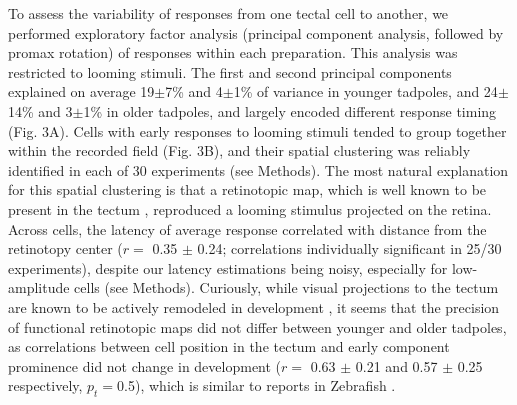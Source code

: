 \documentclass{article}
\begin{document}
To assess the variability of responses from one tectal cell to another, we performed exploratory factor analysis (principal component analysis, followed by promax rotation) of responses within each preparation. This analysis was restricted to looming stimuli. The first and second principal components explained on average 19$\pm$7\% and 4$\pm$1\% of variance in younger tadpoles, and 24$\pm$14\% and 3$\pm$1\% in older tadpoles, and largely encoded different response timing (Fig. 3A). Cells with early responses to looming stimuli tended to group together within the recorded field (Fig. 3B), and their spatial clustering was reliably identified in each of 30 experiments (see Methods). The most natural explanation for this spatial clustering is that a retinotopic map, which is well known to be present in the tectum \citep{ruthazer2004map}, reproduced a looming stimulus projected on the retina. Across cells, the latency of average response correlated with distance from the retinotopy center ($r=$ 0.35 $\pm$ 0.24; correlations individually significant in 25/30 experiments), despite our latency estimations being noisy, especially for low-amplitude cells (see Methods). Curiously, while visual projections to the tectum are known to be actively remodeled in development \citep{sakaguchi1985refinement,ruthazer2004map,munz2014hebbian}, it seems that the precision of functional retinotopic maps did not differ between younger and older tadpoles, as correlations between cell position in the tectum and early component prominence did not change in development ($r=$ 0.63 $\pm$ 0.21 and 0.57 $\pm$ 0.25 respectively, $p_t= $0.5), which is similar to reports in Zebrafish \citep{avitan2016limitations}.

\end{document}
